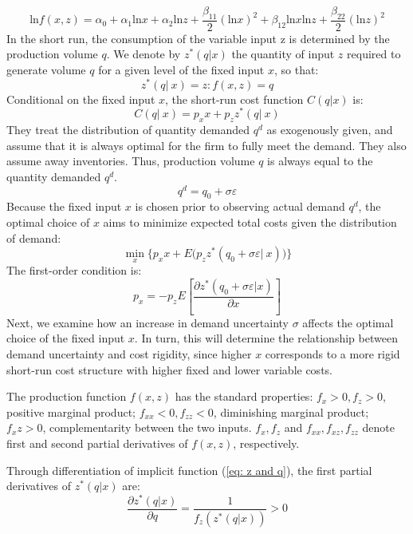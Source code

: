 \documentclass{article}
\begin{document}
\begin{equation}
    \mathrm{ln}f(x,z)=\alpha_0+\alpha_1\mathrm{ln}x+\alpha_2\mathrm{ln}z+\frac{\beta_{11}}{2}(\mathrm{ln}x)^2+\beta_{12}\mathrm{ln}x\mathrm{ln}z+\frac{\beta_{22}}{2}(\mathrm{ln}z)^2
\label{eq: translog production function}
\end{equation}
In the short run, the consumption of the variable input z is determined by the production
volume $q$. We denote by $z^*(q|x)$ the quantity of input $z$ required to generate volume $q$ for a given level of the fixed input $x$, so that:
\begin{equation}
    z^*(q|\:x)=z:f(x,z)=q
\label{eq: z and q}
\end{equation}
Conditional on the fixed input $x$, the short-run cost function $C(q|x)$ is:
\begin{equation}
    C(q|\:x)=p_xx+p_zz^*(q|\:x)
\label{eq: conditional short-run cost function}
\end{equation}
They treat the distribution of quantity demanded $q^d$ as exogenously given, and assume that it is always optimal for the firm to fully meet the demand. They also assume away inventories. Thus, production volume $q$ is always equal to the quantity demanded $q^d.$ 
\begin{equation}
    q^d=q_0+\sigma\varepsilon
\label{eq: volume demanded}
\end{equation}
Because the fixed input $x$ is chosen prior to observing actual demand $q^d$, the optimal choice of $x$ aims to minimize expected total costs given the distribution of demand:
\begin{equation}
    \min_x\Big\{p_xx+E\Big(p_zz^*(q_0+\sigma\varepsilon|\:x)\Big)\Big\}
\label{eq: objective}
\end{equation}
The first-order condition is:
\begin{equation}
    p_x=-p_zE\left[\frac{\partial z^*(q_0+\sigma\varepsilon|x)}{\partial x}\right]
\label{eq: first-order condition}
\end{equation}
Next, we examine how an increase in demand uncertainty $\sigma$ affects the optimal choice of the fixed input $x$. In turn, this will determine the relationship between demand uncertainty and cost rigidity, since higher $x$ corresponds to a more rigid short-run cost structure with higher fixed and lower variable costs.\par
The production function $f(x,z)$ has the standard properties: $f_x>0,f_z>0$, positive marginal product; $f_{xx}<0,f_{zz}<0$, diminishing marginal product; $f_xz>0$, complementarity between the two inputs. $f_x,f_z$ and $f_{xx},f_{xz},f_{zz}$ denote first and second partial derivatives of $f(x,z)$, respectively.\par
Through differentiation of implicit function (\ref{eq: z and q}), the first partial derivatives of $z^*(q|x)$ are:
\begin{equation}
    \frac{\partial z^*(q|x)}{\partial q}=\frac{1}{f_z\left(z^*(q|x)\right)}>0
\label{first partial z on q}
\end{equation}
\end{document}
